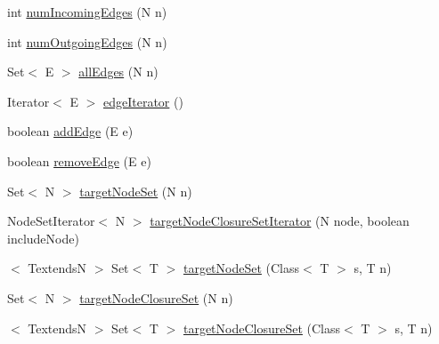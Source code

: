 \begin{DoxyCompactItemize}
int \hyperlink{interfaceorg_1_1tzi_1_1use_1_1graph_1_1_directed_graph_3_01_n_00_01_e_01extends_01_directed_edge_3_01_n_01_4_01_4_acc1f83dd03a879b5a059ea5133cd5ff0}{num\-Incoming\-Edges} (N n)
\item 
int \hyperlink{interfaceorg_1_1tzi_1_1use_1_1graph_1_1_directed_graph_3_01_n_00_01_e_01extends_01_directed_edge_3_01_n_01_4_01_4_ab0cd02ff15a8e1743cd2df95367c568b}{num\-Outgoing\-Edges} (N n)
\item 
Set$<$ E $>$ \hyperlink{interfaceorg_1_1tzi_1_1use_1_1graph_1_1_directed_graph_3_01_n_00_01_e_01extends_01_directed_edge_3_01_n_01_4_01_4_a7e33d0f360e79f229ae01846356e83db}{all\-Edges} (N n)
\item 
Iterator$<$ E $>$ \hyperlink{interfaceorg_1_1tzi_1_1use_1_1graph_1_1_directed_graph_3_01_n_00_01_e_01extends_01_directed_edge_3_01_n_01_4_01_4_a44936f42400ee31c0dc466fa9de0e057}{edge\-Iterator} ()
\item 
boolean \hyperlink{interfaceorg_1_1tzi_1_1use_1_1graph_1_1_directed_graph_3_01_n_00_01_e_01extends_01_directed_edge_3_01_n_01_4_01_4_ade2f1afc7e0912cc7cb6ac8cad41fd38}{add\-Edge} (E e)
\item 
boolean \hyperlink{interfaceorg_1_1tzi_1_1use_1_1graph_1_1_directed_graph_3_01_n_00_01_e_01extends_01_directed_edge_3_01_n_01_4_01_4_aa381869b1e9a877a4a405cc5f0e8f540}{remove\-Edge} (E e)
\item 
Set$<$ N $>$ \hyperlink{interfaceorg_1_1tzi_1_1use_1_1graph_1_1_directed_graph_3_01_n_00_01_e_01extends_01_directed_edge_3_01_n_01_4_01_4_af8c6c0044e36a119030cbb52b44c92b5}{target\-Node\-Set} (N n)
\item 
Node\-Set\-Iterator$<$ N $>$ \hyperlink{interfaceorg_1_1tzi_1_1use_1_1graph_1_1_directed_graph_3_01_n_00_01_e_01extends_01_directed_edge_3_01_n_01_4_01_4_a24c4379777815665537d8243aae792d6}{target\-Node\-Closure\-Set\-Iterator} (N node, boolean include\-Node)
\item 
$<$ Textends\-N $>$ Set$<$ T $>$ \hyperlink{interfaceorg_1_1tzi_1_1use_1_1graph_1_1_directed_graph_3_01_n_00_01_e_01extends_01_directed_edge_3_01_n_01_4_01_4_a60c4786979a0e7577dd51d9db5eedb92}{target\-Node\-Set} (Class$<$ T $>$ s, T n)
\item 
Set$<$ N $>$ \hyperlink{interfaceorg_1_1tzi_1_1use_1_1graph_1_1_directed_graph_3_01_n_00_01_e_01extends_01_directed_edge_3_01_n_01_4_01_4_a01d6e033f212f81d3700877a0cf99864}{target\-Node\-Closure\-Set} (N n)
\item 
$<$ Textends\-N $>$ Set$<$ T $>$ \hyperlink{interfaceorg_1_1tzi_1_1use_1_1graph_1_1_directed_graph_3_01_n_00_01_e_01extends_01_directed_edge_3_01_n_01_4_01_4_a03249a3f84d3343de9c976c5742ade57}{target\-Node\-Closure\-Set} (Class$<$ T $>$ s, T n)

\end{DoxyCompactItemize}
